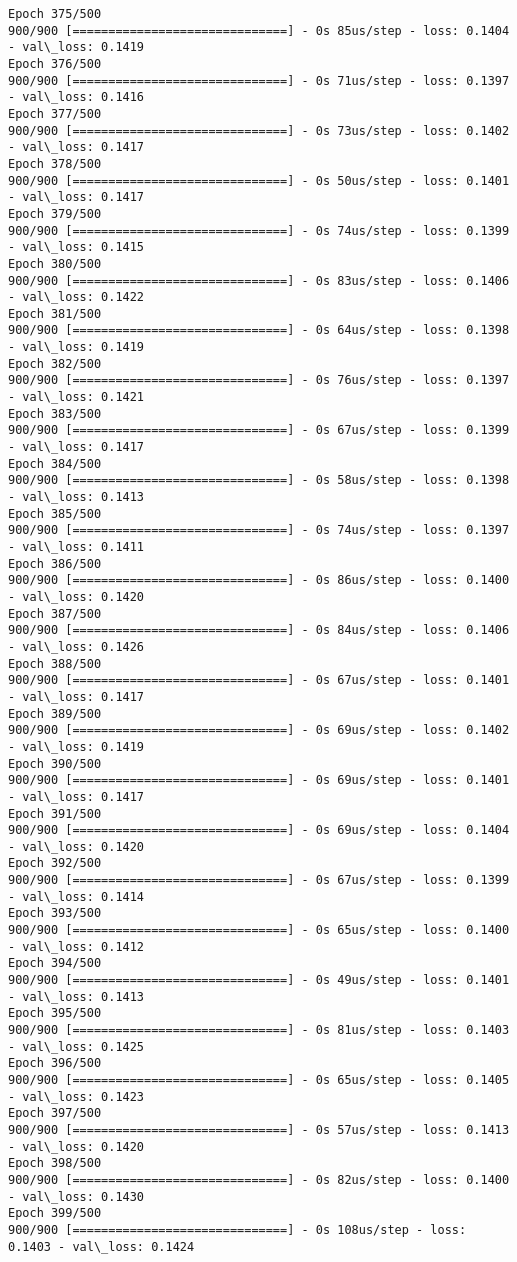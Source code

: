 \documentclass[11pt]{article}
\begin{document}
\begin{Verbatim}[commandchars=\\\{\}]
Epoch 375/500
900/900 [==============================] - 0s 85us/step - loss: 0.1404 - val\_loss: 0.1419
Epoch 376/500
900/900 [==============================] - 0s 71us/step - loss: 0.1397 - val\_loss: 0.1416
Epoch 377/500
900/900 [==============================] - 0s 73us/step - loss: 0.1402 - val\_loss: 0.1417
Epoch 378/500
900/900 [==============================] - 0s 50us/step - loss: 0.1401 - val\_loss: 0.1417
Epoch 379/500
900/900 [==============================] - 0s 74us/step - loss: 0.1399 - val\_loss: 0.1415
Epoch 380/500
900/900 [==============================] - 0s 83us/step - loss: 0.1406 - val\_loss: 0.1422
Epoch 381/500
900/900 [==============================] - 0s 64us/step - loss: 0.1398 - val\_loss: 0.1419
Epoch 382/500
900/900 [==============================] - 0s 76us/step - loss: 0.1397 - val\_loss: 0.1421
Epoch 383/500
900/900 [==============================] - 0s 67us/step - loss: 0.1399 - val\_loss: 0.1417
Epoch 384/500
900/900 [==============================] - 0s 58us/step - loss: 0.1398 - val\_loss: 0.1413
Epoch 385/500
900/900 [==============================] - 0s 74us/step - loss: 0.1397 - val\_loss: 0.1411
Epoch 386/500
900/900 [==============================] - 0s 86us/step - loss: 0.1400 - val\_loss: 0.1420
Epoch 387/500
900/900 [==============================] - 0s 84us/step - loss: 0.1406 - val\_loss: 0.1426
Epoch 388/500
900/900 [==============================] - 0s 67us/step - loss: 0.1401 - val\_loss: 0.1417
Epoch 389/500
900/900 [==============================] - 0s 69us/step - loss: 0.1402 - val\_loss: 0.1419
Epoch 390/500
900/900 [==============================] - 0s 69us/step - loss: 0.1401 - val\_loss: 0.1417
Epoch 391/500
900/900 [==============================] - 0s 69us/step - loss: 0.1404 - val\_loss: 0.1420
Epoch 392/500
900/900 [==============================] - 0s 67us/step - loss: 0.1399 - val\_loss: 0.1414
Epoch 393/500
900/900 [==============================] - 0s 65us/step - loss: 0.1400 - val\_loss: 0.1412
Epoch 394/500
900/900 [==============================] - 0s 49us/step - loss: 0.1401 - val\_loss: 0.1413
Epoch 395/500
900/900 [==============================] - 0s 81us/step - loss: 0.1403 - val\_loss: 0.1425
Epoch 396/500
900/900 [==============================] - 0s 65us/step - loss: 0.1405 - val\_loss: 0.1423
Epoch 397/500
900/900 [==============================] - 0s 57us/step - loss: 0.1413 - val\_loss: 0.1420
Epoch 398/500
900/900 [==============================] - 0s 82us/step - loss: 0.1400 - val\_loss: 0.1430
Epoch 399/500
900/900 [==============================] - 0s 108us/step - loss: 0.1403 - val\_loss: 0.1424

\end{Verbatim}
\end{document}
